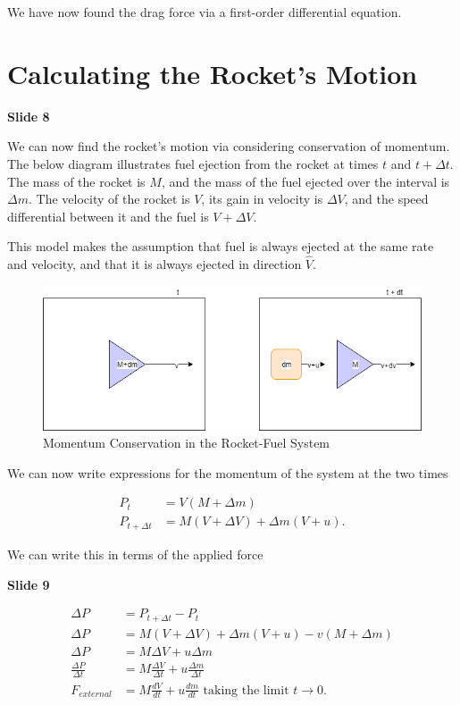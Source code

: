 \documentclass[]{article}
\begin{document}
We have now found the drag force via a first-order differential equation.


\section{Calculating the Rocket's Motion}
\textbf{Slide 8}

We can now find the rocket's motion via considering conservation of momentum. The below diagram illustrates fuel ejection from the rocket at times $t$ and $t+\Delta t$. The mass of the rocket is $M$, and the mass of the fuel ejected over the interval is $\Delta m$. The velocity of the rocket is $V$, its gain in velocity is $\Delta V$, and the speed differential between it and the fuel is $V+\Delta V$.

This model makes the assumption that fuel is always ejected at the same rate and velocity, and that it is always ejected in direction $\hat{V}$.

\begin{figure}[h]
	\begin{center}
		\caption{Momentum Conservation in the Rocket-Fuel System}
		\label{momentum}
		\includegraphics[scale=0.6]{momentum.png}
	\end{center}
\end{figure}

We can now write expressions for the momentum of the system at the two times

\begin{center}
	\begin{align*}
	P_{t} &= V(M+\Delta m) \\
	P_{t+\Delta t} &= M(V + \Delta V) + \Delta m (V+u) .
	\end{align*}
\end{center}

We can write this in terms of the applied force

\textbf{Slide 9}

\begin{center}
	\begin{align*}
	\Delta P &= P_{t+\Delta t} - P_{t} \\
	\Delta P &= M(V + \Delta V) + \Delta m (V+u) - v(M+\Delta m) \\
	\Delta P &= M\Delta V + u\Delta m \\
	\frac{\Delta P}{\Delta t} &= M\frac{\Delta V}{\Delta t} +  u\frac{\Delta m}{\Delta t} \\
	F_{external} &= M \frac{dV}{dt} + u \frac{dm}{dt} \text{  taking the limit $t\rightarrow 0$} .
	\end{align*}
\end{center}
\end{document}
